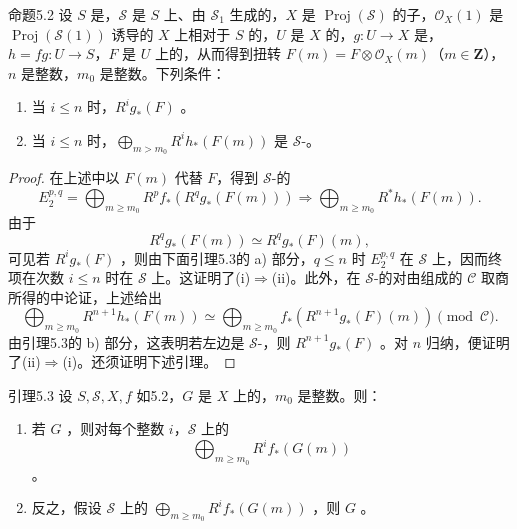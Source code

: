 \begin{SGAresult}{命题}{5.2}
设 $S$ 是，$\mathscr S$ 是 $S$ 上、由 $\mathscr S_1$ 生成的，$X$ 是 $\operatorname{Proj}(\mathscr S)$ 的子，$\mathcal O_X(1)$ 是 $\operatorname{Proj}(\mathscr S(1))$ 诱导的 $X$ 上相对于 $S$ 的，$U$ 是 $X$ 的，$g:U\to X$ 是，$h=fg:U\to S$，$F$ 是 $U$ 上的，从而得到扭转 $F(m)=F\otimes\mathcal O_X(m)$（$m\in\mathbf Z$），$n$ 是整数，$m_0$ 是整数。下列条件：
\begin{enumerate}
\item[(i)] 当 $i\leq n$ 时，$R^ig_*(F)$ 。
\item[(ii)] 当 $i\leq n$ 时，$\bigoplus_{m>m_0}R^ih_*(F(m))$ 是 $\mathscr S$-。
\end{enumerate}
\end{SGAresult}
\begin{proof}
在上述中以 $F(m)$ 代替 $F$，得到 $\mathscr S$-的
\[
 E_2^{p,q}=\bigoplus_{m\geq m_0}R^pf_*(R^qg_*(F(m)))
 \Longrightarrow\bigoplus_{m\geq m_0}R^*h_*(F(m)).
\]
由于
\[
 R^qg_*(F(m))\simeq R^qg_*(F)(m),
\]
可见若 $R^ig_*(F)$ ，则由下面引理5.3的 a) 部分，$q\leq n$ 时 $E_2^{p,q}$ 在 $\mathscr S$ 上，因而终项在次数 $i\leq n$ 时在 $\mathscr S$ 上。这证明了(i)$\Rightarrow$(ii)。此外，在 $\mathscr S$-的对由组成的 $\mathcal C$ 取商所得的中论证，上述给出
\[
 \bigoplus_{m\geq m_0}R^{n+1}h_*(F(m))
 \simeq\bigoplus_{m\geq m_0}f_*(R^{n+1}g_*(F)(m))\pmod{\mathcal C}.
\]
由引理5.3的 b) 部分，这表明若左边是 $\mathscr S$-，则 $R^{n+1}g_*(F)$ 。对 $n$ 归纳，便证明了(ii)$\Rightarrow$(i)。还须证明下述引理。
\end{proof}
\begin{SGAresult}{引理}{5.3}
设 $S,\mathscr S,X,f$ 如5.2，$G$ 是 $X$ 上的，$m_0$ 是整数。则：
\begin{enumerate}
\item[a)] 若 $G$ ，则对每个整数 $i$，$\mathscr S$ 上的
\[
 \bigoplus_{m\geq m_0}R^if_*(G(m))
\]
。
\item[b)] 反之，假设 $\mathscr S$ 上的 $\bigoplus_{m\geq m_0}R^if_*(G(m))$ ，则 $G$ 。
\end{enumerate}
\end{SGAresult}
